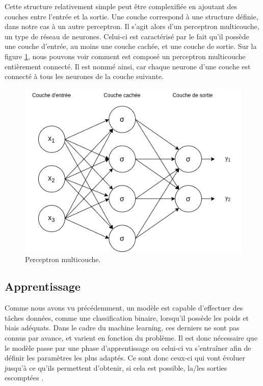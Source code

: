 Cette structure relativement simple peut être complexifiée en ajoutant des couches entre l'entrée et la sortie. Une couche correspond à une structure définie, dans notre cas à un autre perceptron. Il s'agit alors d'un perceptron multicouche, un type de réseau de neurones. Celui-ci est caractérisé par le fait qu'il possède une couche d'entrée, au moins une couche cachée, et une couche de sortie. Sur la figure \ref{fig:perceptron_multicouche}, nous pouvons voir comment est composé un perceptron multicouche entièrement connecté. Il est nommé ainsi, car chaque neurone d'une couche est connecté à tous les neurones de la couche suivante.

\begin{figure}[hbt!]
    \centering
    \includegraphics[scale=0.50]{Figures/perceptron_multicouche.png}
    \caption{Perceptron multicouche.}
    \label{fig:perceptron_multicouche}
\end{figure}

\subsection{Apprentissage}

Comme nous avons vu précédemment, un modèle est capable d'effectuer des tâches données, comme une classification binaire, lorsqu'il possède les poids et biais adéquats. Dans le cadre du machine learning, ces derniers ne sont pas connus par avance, et varient en fonction du problème. Il est donc nécessaire que le modèle passe par une phase d'apprentissage ou celui-ci va s'entraîner afin de définir les paramètres les plus adaptés. Ce sont donc ceux-ci qui vont évoluer jusqu'à ce qu'ils permettent d'obtenir, si cela est possible, la/les sorties escomptées \cite{fleuret_deep_nodate-3}.

